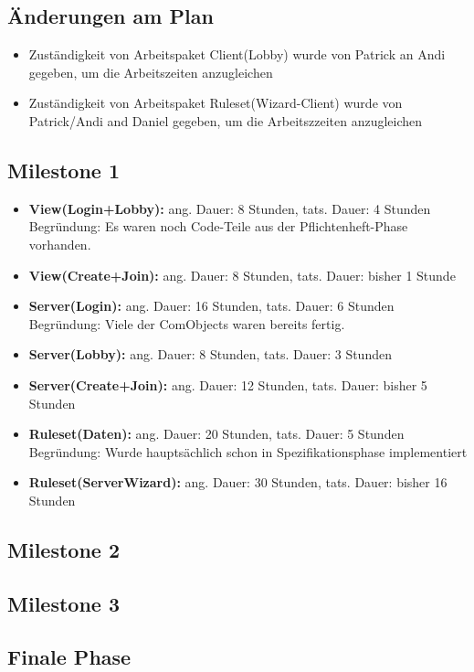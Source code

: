 \documentclass{article}
\begin{document}
\subsection{Änderungen am Plan}
\begin{itemize}
\item Zuständigkeit von Arbeitspaket Client(Lobby) wurde von Patrick an Andi gegeben, um die Arbeitszeiten anzugleichen
\item Zuständigkeit von Arbeitspaket Ruleset(Wizard-Client) wurde von Patrick/Andi and Daniel gegeben, um die Arbeitszzeiten anzugleichen
\end{itemize}

\subsection{Milestone 1}

\begin{itemize}
\item \textbf{View(Login+Lobby):} ang. Dauer: 8 Stunden, tats. Dauer: 4 Stunden \\
Begründung: Es waren noch Code-Teile aus der Pflichtenheft-Phase vorhanden.
\item \textbf{View(Create+Join):} ang. Dauer: 8 Stunden, tats. Dauer: bisher 1 Stunde
\item \textbf{Server(Login):} ang. Dauer: 16 Stunden, tats. Dauer: 6 Stunden \\
Begründung: Viele der ComObjects waren bereits fertig.
\item \textbf{Server(Lobby):} ang. Dauer: 8 Stunden, tats. Dauer: 3 Stunden 
\item \textbf{Server(Create+Join):} ang. Dauer: 12 Stunden, tats. Dauer: bisher 5 Stunden
\item \textbf{Ruleset(Daten):} ang. Dauer: 20 Stunden, tats. Dauer: 5 Stunden
Begründung: Wurde hauptsächlich schon in Spezifikationsphase implementiert

\item \textbf{Ruleset(ServerWizard):} ang. Dauer: 30 Stunden, tats. Dauer: bisher 16 Stunden

\end{itemize}

\subsection{Milestone 2}

\subsection{Milestone 3}

\subsection{Finale Phase}
\end{document}
